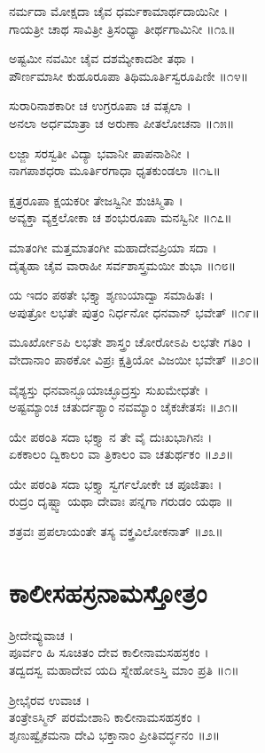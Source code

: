 ನರ್ಮದಾ ಮೋಕ್ಷದಾ ಚೈವ ಧರ್ಮಕಾಮಾರ್ಥದಾಯಿನೀ ।\\
ಗಾಯತ್ರೀ ಚಾಥ ಸಾವಿತ್ರೀ ತ್ರಿಸಂಧ್ಯಾ ತೀರ್ಥಗಾಮಿನೀ ॥೧೩॥

ಅಷ್ಟಮೀ ನವಮೀ ಚೈವ ದಶಮ್ಯೇಕಾದಶೀ ತಥಾ ।\\
ಪೌರ್ಣಮಾಸೀ ಕುಹೂರೂಪಾ ತಿಥಿಮೂರ್ತಿಸ್ವರೂಪಿಣೀ ॥೧೪॥

ಸುರಾರಿನಾಶಕಾರೀ ಚ ಉಗ್ರರೂಪಾ ಚ ವತ್ಸಲಾ ।\\
ಅನಲಾ ಅರ್ಧಮಾತ್ರಾ ಚ ಅರುಣಾ ಪೀತಲೋಚನಾ ॥೧೫॥

ಲಜ್ಜಾ ಸರಸ್ವತೀ ವಿದ್ಯಾ ಭವಾನೀ ಪಾಪನಾಶಿನೀ ।\\
ನಾಗಪಾಶಧರಾ ಮೂರ್ತಿರಗಾಧಾ ಧೃತಕುಂಡಲಾ ॥೧೬॥

ಕ್ಷತ್ರರೂಪಾ ಕ್ಷಯಕರೀ ತೇಜಸ್ವಿನೀ ಶುಚಿಸ್ಮಿತಾ ।\\
ಅವ್ಯಕ್ತಾ ವ್ಯಕ್ತಲೋಕಾ ಚ ಶಂಭುರೂಪಾ ಮನಸ್ವಿನೀ ॥೧೭॥

ಮಾತಂಗೀ ಮತ್ತಮಾತಂಗೀ ಮಹಾದೇವಪ್ರಿಯಾ ಸದಾ ।\\
ದೈತ್ಯಹಾ ಚೈವ ವಾರಾಹೀ ಸರ್ವಶಾಸ್ತ್ರಮಯೀ ಶುಭಾ ॥೧೮॥

ಯ ಇದಂ ಪಠತೇ ಭಕ್ತ್ಯಾ ಶೃಣುಯಾದ್ವಾ ಸಮಾಹಿತಃ ।\\
ಅಪುತ್ರೋ ಲಭತೇ ಪುತ್ರಂ ನಿರ್ಧನೋ ಧನವಾನ್ ಭವೇತ್ ॥೧೯॥

ಮೂರ್ಖೋಽಪಿ ಲಭತೇ ಶಾಸ್ತ್ರಂ ಚೋರೋಽಪಿ ಲಭತೇ ಗತಿಂ ।\\
ವೇದಾನಾಂ ಪಾಠಕೋ ವಿಪ್ರಃ ಕ್ಷತ್ರಿಯೋ ವಿಜಯೀ ಭವೇತ್ ॥೨೦॥

ವೈಶ್ಯಸ್ತು ಧನವಾನ್ಭೂಯಾಚ್ಛೂದ್ರಸ್ತು ಸುಖಮೇಧತೇ ।\\
ಅಷ್ಟಮ್ಯಾಂಚ ಚತುರ್ದಶ್ಯಾಂ ನವಮ್ಯಾಂ ಚೈಕಚೇತಸಃ ॥೨೧॥

ಯೇ ಪಠಂತಿ ಸದಾ ಭಕ್ತ್ಯಾ ನ ತೇ ವೈ ದುಃಖಭಾಗಿನಃ ।\\
ಏಕಕಾಲಂ ದ್ವಿಕಾಲಂ ವಾ ತ್ರಿಕಾಲಂ ವಾ ಚತುರ್ಥಕಂ ॥೨೨॥

ಯೇ ಪಠಂತಿ ಸದಾ ಭಕ್ತ್ಯಾ ಸ್ವರ್ಗಲೋಕೇ ಚ ಪೂಜಿತಾಃ ।\\
ರುದ್ರಂ ದೃಷ್ಟ್ವಾ ಯಥಾ ದೇವಾಃ ಪನ್ನಗಾ ಗರುಡಂ ಯಥಾ ॥

ಶತ್ರವಃ ಪ್ರಪಲಾಯಂತೇ ತಸ್ಯ ವಕ್ತ್ರವಿಲೋಕನಾತ್ ॥೨೩॥

\section{ಕಾಲೀಸಹಸ್ರನಾಮಸ್ತೋತ್ರಂ}

ಶ್ರೀದೇವ್ಯುವಾಚ ।\\
ಪೂರ್ವಂ ಹಿ ಸೂಚಿತಂ ದೇವ ಕಾಲೀನಾಮಸಹಸ್ರಕಂ ।\\
ತದ್ವದಸ್ವ ಮಹಾದೇವ ಯದಿ ಸ್ನೇಹೋಽಸ್ತಿ ಮಾಂ ಪ್ರತಿ ॥೧॥

ಶ್ರೀಭೈರವ ಉವಾಚ ।\\
ತಂತ್ರೇಽಸ್ಮಿನ್ ಪರಮೇಶಾನಿ ಕಾಲೀನಾಮಸಹಸ್ರಕಂ ।\\
ಶೃಣುಷ್ವೈಕಮನಾ ದೇವಿ ಭಕ್ತಾನಾಂ ಪ್ರೀತಿವರ್ದ್ಧನಂ ॥೨॥

